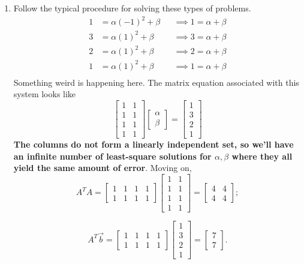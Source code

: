 \begin{enumerate}
	\item[\textbf{Q9}] Follow the typical procedure for solving these types of problems.
					\[\begin{aligned}
						1 &= \alpha (-1)^2 + \beta &&\implies 1 = \alpha + \beta \\
						3 &= \alpha (1)^2  + \beta &&\implies 3 = \alpha + \beta \\
						2 &= \alpha (1)^2  + \beta &&\implies 2 = \alpha + \beta \\
						1 &= \alpha (1)^2  + \beta &&\implies 1 = \alpha + \beta \\
					\end{aligned}\]
					Something weird is happening here. The matrix equation associated with this system looks like 
					\[\begin{bmatrix}1 & 1 \\ 1 & 1 \\ 1 & 1 \\ 1 & 1\end{bmatrix}\begin{bmatrix}\alpha \\ \beta\end{bmatrix} 
					  = \begin{bmatrix}1 \\ 3 \\ 2 \\ 1\end{bmatrix}\]
					\textbf{The columns do not form a linearly independent set, so we'll have an infinite number of least-square solutions for 
					\(\alpha, \beta\) where they all yield the same amount of error}. Moving on,
					\[A^TA = \begin{bmatrix}1 & 1 & 1 & 1 \\ 1 & 1 & 1 & 1\end{bmatrix}
					\begin{bmatrix}1 & 1 \\ 1 & 1 \\ 1 & 1 \\ 1 & 1\end{bmatrix} = \begin{bmatrix}4 & 4 \\ 4 & 4\end{bmatrix};\]

					\[A^T\vec{b} = \begin{bmatrix}1 & 1 & 1 & 1 \\ 1 & 1 & 1 & 1\end{bmatrix}\begin{bmatrix}1 \\ 3 \\ 2 \\ 1\end{bmatrix}
					 = \begin{bmatrix}7 \\ 7\end{bmatrix}.\]


\end{enumerate}
